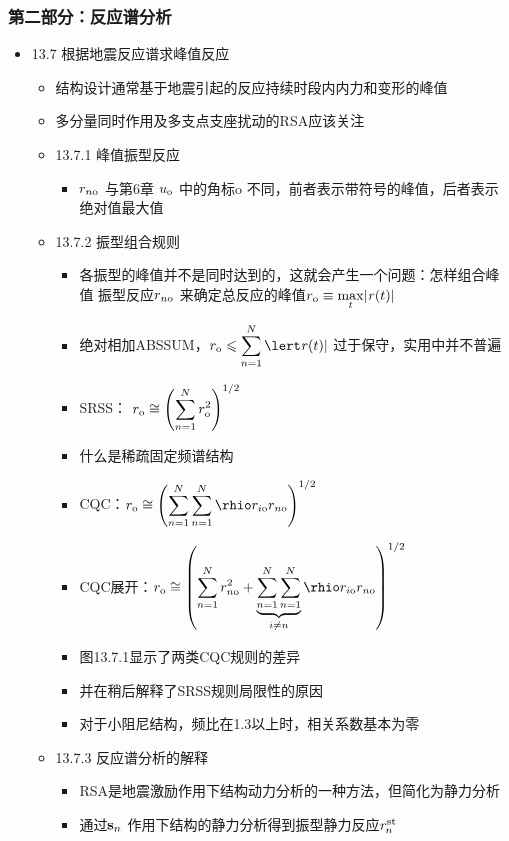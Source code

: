\documentclass[11pt]{article}
\begin{document}
\subsubsection*{第二部分：反应谱分析}
\label{sec:org6b0c17b}
\begin{itemize}
\item 13.7 根据地震反应谱求峰值反应
\label{sec:orgc4ff4c3}
\begin{itemize}
\item 结构设计通常基于地震引起的反应持续时段内内力和变形的峰值
\item 多分量同时作用及多支点支座扰动的RSA应该关注
\end{itemize}
\begin{itemize}
\item 13.7.1 峰值振型反应
\label{sec:org64954d1}
\begin{itemize}
\item \(r_{n\mathrm{o}}\) 与第6章 \(u_\mathrm{o}\) 中的角标\(\mathrm{o}\) 不同，前者表示带符号的峰值，后者表示绝对值最大值
\end{itemize}
\item 13.7.2 振型组合规则
\label{sec:org20f48f3}
\begin{itemize}
\item 各振型的峰值并不是同时达到的，这就会产生一个问题：怎样组合峰值
振型反应\(r_{n\mathrm{o}}\) 来确定总反应的峰值\(r_{\mathrm{o}} \equiv \underset{t}{\mathrm{max}} \lvert \mathit{r}(t) \rvert\)
\item 绝对相加ABSSUM，\(\ro \leqslant \sumn \lert \rt \vert\) 过于保守，实用中并不普遍
\item SRSS： \(r_{\mathrm{o}} \cong \left( \displaystyle\sum_{n=1}^{N} r_{\mathrm{o}}^{2} \right) ^{1/2}\)
\item 什么是稀疏固定频谱结构
\item CQC：\(\ro \cong \left( \sumn \sumn \rhio \rio \rno \right) ^{1/2}\)
\item CQC展开：\(\ro \cong \left( \sumn \rno^{2} + \sumin \rhio \rio \rno \right) ^{1/2}\)
\item 图13.7.1显示了两类CQC规则的差异
\item 并在稍后解释了SRSS规则局限性的原因
\item 对于小阻尼结构，频比在1.3以上时，相关系数基本为零
\end{itemize}
\item 13.7.3 反应谱分析的解释
\label{sec:org63592d7}
\begin{itemize}
\item RSA是地震激励作用下结构动力分析的一种方法，但简化为静力分析
\item 通过\(\bm{\mathrm{s}}_{n}\) 作用下结构的静力分析得到振型静力反应\(\mathit{r}^{\mathrm{st}}_{n}\)

\end{itemize}
\end{itemize}
\end{itemize}
\end{document}

